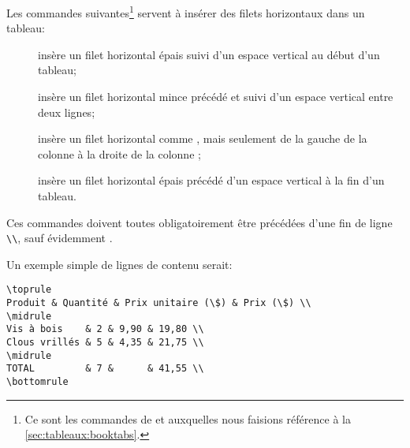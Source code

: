 \begin{list}{}
  Les commandes suivantes\footnote{%
    Ce sont les commandes de  et 
auxquelles nous faisions référence à la \autoref{sec:tableaux:booktabs}.} %
  servent à insérer des filets horizontaux dans un tableau:
  \begin{description}
  \item[\normalfont\cmd{\toprule}] insère un filet horizontal épais
    suivi d'un espace vertical au début d'un tableau;
  \item[\normalfont\cmd{\midrule}] insère un filet horizontal mince
    précédé et suivi d'un espace vertical entre deux lignes;
  \item[\normalfont{}] insère un filet
    horizontal comme \cmd{\midrule}, mais seulement de la gauche de la
    colonne  à la droite de la colonne ;
  \item[\normalfont\cmd{\bottomrule}] insère un filet horizontal épais
    précédé d'un espace vertical à la fin d'un tableau.
  \end{description}
  Ces commandes doivent toutes obligatoirement être précédées d'une
  fin de ligne \verb=\\=, sauf évidemment \cmd{\toprule}.

  Un exemple simple de lignes de contenu serait:
\begin{lstlisting}
\toprule
Produit & Quantité & Prix unitaire (\$) & Prix (\$) \\
\midrule
Vis à bois    & 2 & 9,90 & 19,80 \\
Clous vrillés & 5 & 4,35 & 21,75 \\
\midrule
TOTAL         & 7 &      & 41,55 \\
\bottomrule
\end{lstlisting}
\end{list}

